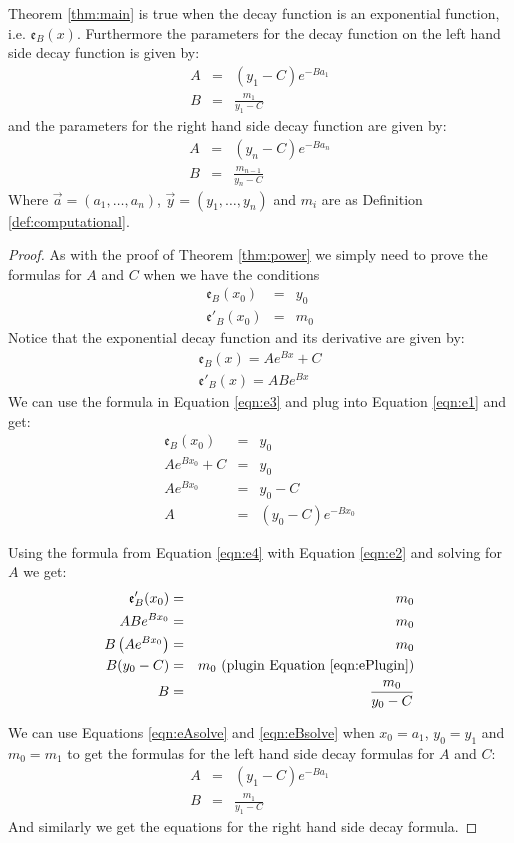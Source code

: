 \documentclass[10pt]{article}
\begin{document}
\begin{theorem}
\label{thm:exponential}
Theorem \ref{thm:main} is true when the decay function is an exponential function, i.e.
$\mathfrak{e}_{B}(x)$.  Furthermore the parameters for the decay function on the left hand
side decay function is given by:
\begin{eqnarray*}
A&=&(y_1-C)e^{-Ba_1}\\
B &=& \frac{m_1}{y_1-C}
\end{eqnarray*}
and the parameters for the right hand side decay function are given by:
\begin{eqnarray*}
A&=&(y_n-C)e^{-Ba_n}\\
B &=& \frac{m_{n-1}}{y_n-C}
\end{eqnarray*}
Where $\vec{a}=(a_1, \ldots, a_n)$, $\vec{y}=(y_1,\ldots,y_n)$ and $m_i$ are
as Definition \ref{def:computational}.
\end{theorem}
\begin{proof}
As with the proof of Theorem \ref{thm:power} we simply need to prove the
formulas for $A$ and $C$ when we have the conditions
\begin{eqnarray}
\mathfrak{e}_{B}(x_0) &=& y_0 \label{eqn:e1}\\
\mathfrak{e}'_{B}(x_0) &=& m_0 \label{eqn:e2}
\end{eqnarray}
Notice that the exponential decay function and its derivative are given by:
\begin{eqnarray}
\mathfrak{e}_{B}(x) = Ae^{Bx}+C \label{eqn:e3}\\
\mathfrak{e}'_{B}(x) = ABe^{Bx} \label{eqn:e4}
\end{eqnarray}
We can use the formula in Equation \ref{eqn:e3} and plug into Equation \ref{eqn:e1}
and get:
\begin{eqnarray}
\mathfrak{e}_{B}(x_0) &=& y_0 \\
Ae^{Bx_0} + C &=& y_0 \\
Ae^{Bx_0} &=& y_0 - C \label{eqn:ePlugin}\\
A&=&(y_0-C)e^{-Bx_0} \label{eqn:eAsolve}
\end{eqnarray}

Using the formula from Equation \ref{eqn:e4} with Equation \ref{eqn:e2} and
solving for $A$ we get:
\begin{eqnarray}
\mathfrak{e}'_{B}(x_0) &=& m_0 \\
ABe^{Bx_0} &=& m_0 \\
B \left(Ae^{Bx_0} \right)&=& m_0 \\
B(y_0-C) &=&m_0 \hbox{ (plugin Equation \ref{eqn:ePlugin})} \\
B &=& \frac{m_0}{y_0-C} \label{eqn:eBsolve}
\end{eqnarray}

We can use Equations \ref{eqn:eAsolve} and \ref{eqn:eBsolve} when $x_0=a_1$,
$y_0=y_1$ and $m_0=m_1$ to get the formulas for the left hand side decay formulas
for $A$ and $C$:
\begin{eqnarray*}
A&=&(y_1-C)e^{-Ba_1}\\
B &=& \frac{m_1}{y_1-C}
\end{eqnarray*}
And similarly we get the equations for the right hand side decay formula.
\end{proof}
%
%
\end{document}
